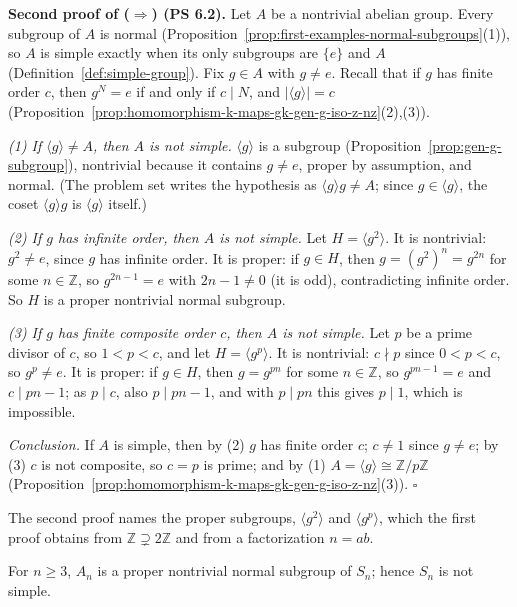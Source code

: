 \documentclass[11pt]{report}
\renewenvironment{proof}[1][Proof]{\noindent\textbf{#1.} }{\hfill$\square$\par\vspace{5pt}}
\begin{document}
\begin{proof}[Second proof of ($\Rightarrow$) (PS 6.2)]
Let $A$ be a nontrivial abelian group. Every subgroup of $A$ is normal (Proposition~\ref{prop:first-examples-normal-subgroups}(1)), so $A$ is simple exactly when its only subgroups are $\{e\}$ and $A$ (Definition~\ref{def:simple-group}). Fix $g \in A$ with $g \neq e$. Recall that if $g$ has finite order $c$, then $g^N = e$ if and only if $c \mid N$, and $|\langle g \rangle| = c$ (Proposition~\ref{prop:homomorphism-k-maps-gk-gen-g-iso-z-nz}(2),(3)).

\emph{(1) If $\langle g \rangle \neq A$, then $A$ is not simple.} $\langle g \rangle$ is a subgroup (Proposition~\ref{prop:gen-g-subgroup}), nontrivial because it contains $g \neq e$, proper by assumption, and normal. (The problem set writes the hypothesis as $\langle g \rangle g \neq A$; since $g \in \langle g \rangle$, the coset $\langle g \rangle g$ is $\langle g \rangle$ itself.)

\emph{(2) If $g$ has infinite order, then $A$ is not simple.} Let $H = \langle g^2 \rangle$. It is nontrivial: $g^2 \neq e$, since $g$ has infinite order. It is proper: if $g \in H$, then $g = (g^2)^n = g^{2n}$ for some $n \in \mathbb{Z}$, so $g^{2n-1} = e$ with $2n - 1 \neq 0$ (it is odd), contradicting infinite order. So $H$ is a proper nontrivial normal subgroup.

\emph{(3) If $g$ has finite composite order $c$, then $A$ is not simple.} Let $p$ be a prime divisor of $c$, so $1 < p < c$, and let $H = \langle g^p \rangle$. It is nontrivial: $c \nmid p$ since $0 < p < c$, so $g^p \neq e$. It is proper: if $g \in H$, then $g = g^{pn}$ for some $n \in \mathbb{Z}$, so $g^{pn-1} = e$ and $c \mid pn - 1$; as $p \mid c$, also $p \mid pn - 1$, and with $p \mid pn$ this gives $p \mid 1$, which is impossible.

\emph{Conclusion.} If $A$ is simple, then by (2) $g$ has finite order $c$; $c \neq 1$ since $g \neq e$; by (3) $c$ is not composite, so $c = p$ is prime; and by (1) $A = \langle g \rangle \cong \mathbb{Z}/p\mathbb{Z}$ (Proposition~\ref{prop:homomorphism-k-maps-gk-gen-g-iso-z-nz}(3)).
\end{proof}

The second proof names the proper subgroups, $\langle g^2 \rangle$ and $\langle g^p \rangle$, which the first proof obtains from $\mathbb{Z} \supsetneq 2\mathbb{Z}$ and from a factorization $n = ab$.

\begin{corbox}\label{cor:sn-not-simple-n-ge-3}
For $n \geq 3$, $A_n$ is a proper nontrivial normal subgroup of $S_n$; hence $S_n$ is not simple.
\end{corbox}
\end{document}
